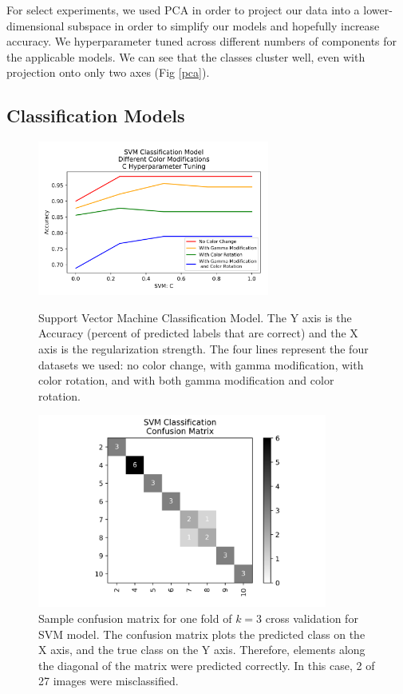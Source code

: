 \documentclass[journal]{IEEEtran}
\begin{document}
For select experiments, we used PCA in order to project our data into a lower-dimensional subspace in order to simplify our models and hopefully increase accuracy. We hyperparameter tuned across different numbers of components for the applicable models. We can see that the classes cluster well, even with projection onto only two axes (Fig \ref{pca}).

\subsection{Classification Models}

\begin{figure}
\centering
\includegraphics[height=2in]{SVM/svm_classification.png}
\caption{Support Vector Machine Classification Model. The Y axis is the Accuracy (percent of predicted labels that are correct) and the X axis is the regularization strength. The four lines represent the four datasets we used: no color change, with gamma modification, with color rotation, and with both gamma modification and color rotation.}
\label{svm}

\centering
\includegraphics[height=2.5in]{SVM/SVM_classification_cfm.png}
\caption{Sample confusion matrix for one fold of $k=3$ cross validation for SVM model. The confusion matrix plots the predicted class on the X axis, and the true class on the Y axis. Therefore, elements along the diagonal of the matrix were predicted correctly. In this case, 2 of 27 images were misclassified.}
\label{svm_confusion}
\end{figure}
\end{document}
